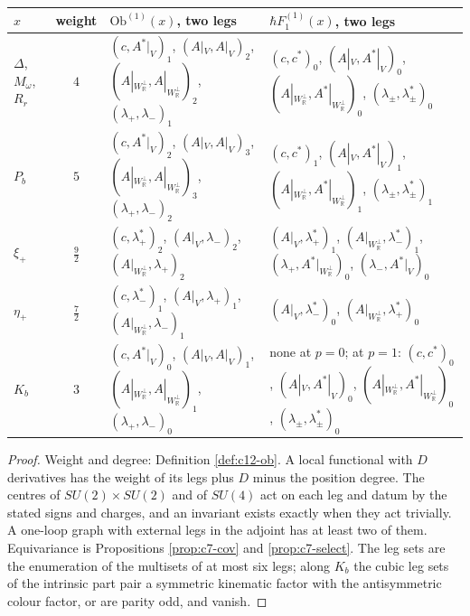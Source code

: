 \begin{tabular}{l|c|l|l}
$x$ & weight & $\mathrm{Ob}^{(1)}(x)$, two legs & $\hbar F_1^{(1)}(x)$, two legs\\
\hline
$\Delta$, $M_\omega$, $R_r$ & $4$ & $(c,A^*|_V)_1$, $(A|_V,A|_V)_2$, $(A|_{W_{\mathbb R}^\perp},A|_{W_{\mathbb R}^\perp})_2$, $(\lambda_+,\lambda_-)_1$ & $(c,c^*)_0$, $(A|_V,A^*|_V)_0$, $(A|_{W_{\mathbb R}^\perp},A^*|_{W_{\mathbb R}^\perp})_0$, $(\lambda_\pm,\lambda^*_\pm)_0$\\
$P_b$ & $5$ & $(c,A^*|_V)_2$, $(A|_V,A|_V)_3$, $(A|_{W_{\mathbb R}^\perp},A|_{W_{\mathbb R}^\perp})_3$, $(\lambda_+,\lambda_-)_2$ & $(c,c^*)_1$, $(A|_V,A^*|_V)_1$, $(A|_{W_{\mathbb R}^\perp},A^*|_{W_{\mathbb R}^\perp})_1$, $(\lambda_\pm,\lambda^*_\pm)_1$\\
$\xi_+$ & $\tfrac92$ & $(c,\lambda^*_+)_2$, $(A|_V,\lambda_-)_2$, $(A|_{W_{\mathbb R}^\perp},\lambda_+)_2$ & $(A|_V,\lambda^*_+)_1$, $(A|_{W_{\mathbb R}^\perp},\lambda^*_-)_1$, $(\lambda_+,A^*|_{W_{\mathbb R}^\perp})_0$, $(\lambda_-,A^*|_V)_0$\\
$\eta_+$ & $\tfrac72$ & $(c,\lambda^*_-)_1$, $(A|_V,\lambda_+)_1$, $(A|_{W_{\mathbb R}^\perp},\lambda_-)_1$ & $(A|_V,\lambda^*_-)_0$, $(A|_{W_{\mathbb R}^\perp},\lambda^*_+)_0$\\
$K_b$ & $3$ & $(c,A^*|_V)_0$, $(A|_V,A|_V)_1$, $(A|_{W_{\mathbb R}^\perp},A|_{W_{\mathbb R}^\perp})_1$, $(\lambda_+,\lambda_-)_0$ & none at $p=0$; at $p=1$: $(c,c^*)_0$, $(A|_V,A^*|_V)_0$, $(A|_{W_{\mathbb R}^\perp},A^*|_{W_{\mathbb R}^\perp})_0$, $(\lambda_\pm,\lambda^*_\pm)_0$\\
\end{tabular}

\begin{proof}
Weight and degree: Definition \ref{def:c12-ob}. A local functional with $D$ derivatives has the weight of its legs plus $D$ minus the position degree. The centres of $SU(2)\times SU(2)$ and of $SU(4)$ act on each leg and datum by the stated signs and charges, and an invariant exists exactly when they act trivially. A one-loop graph with external legs in the adjoint has at least two of them. Equivariance is Propositions \ref{prop:c7-cov} and \ref{prop:c7-select}. The leg sets are the enumeration of the multisets of at most six legs; along $K_b$ the cubic leg sets of the intrinsic part pair a symmetric kinematic factor with the antisymmetric colour factor, or are parity odd, and vanish.
\end{proof}

